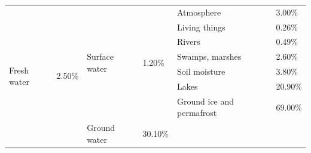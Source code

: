 \begin{itemize}
\begin{table}[ht]
\begin{center}
\begin{tabular}{|l|l|llll}
\hline
\multirow{9}{*}{Fresh water} & \multirow{9}{*}{2.50\%} & \multicolumn{1}{l|}{\multirow{7}{*}{Surface water}} & \multicolumn{1}{l|}{\multirow{7}{*}{1.20\%}} & \multicolumn{1}{l|}{Atmosphere}                & \multicolumn{1}{l|}{3.00\%}  \\ \cline{5-6} 
                             &                         & \multicolumn{1}{l|}{}                               & \multicolumn{1}{l|}{}                        & \multicolumn{1}{l|}{Living things}             & \multicolumn{1}{l|}{0.26\%}  \\ \cline{5-6} 
                             &                         & \multicolumn{1}{l|}{}                               & \multicolumn{1}{l|}{}                        & \multicolumn{1}{l|}{Rivers}                    & \multicolumn{1}{l|}{0.49\%}  \\ \cline{5-6} 
                             &                         & \multicolumn{1}{l|}{}                               & \multicolumn{1}{l|}{}                        & \multicolumn{1}{l|}{Swamps, marshes}           & \multicolumn{1}{l|}{2.60\%}  \\ \cline{5-6} 
                             &                         & \multicolumn{1}{l|}{}                               & \multicolumn{1}{l|}{}                        & \multicolumn{1}{l|}{Soil moisture}             & \multicolumn{1}{l|}{3.80\%}  \\ \cline{5-6} 
                             &                         & \multicolumn{1}{l|}{}                               & \multicolumn{1}{l|}{}                        & \multicolumn{1}{l|}{Lakes}                     & \multicolumn{1}{l|}{20.90\%} \\ \cline{5-6} 
                             &                         & \multicolumn{1}{l|}{}                               & \multicolumn{1}{l|}{}                        & \multicolumn{1}{l|}{Ground ice and permafrost} & \multicolumn{1}{l|}{69.00\%} \\ \cline{3-6} 
                             &                         & \multicolumn{1}{l|}{Ground water}                   & \multicolumn{1}{l|}{30.10\%}                 &                                                &                              \\ \cline{3-4}

\end{tabular}
\end{center}
\end{table}
\end{itemize}
